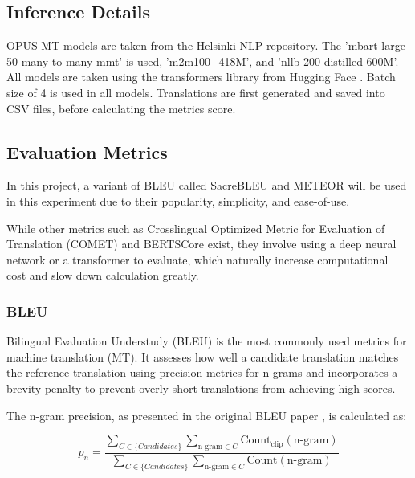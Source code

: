 \documentclass[a4paper]{article}
\begin{document}


\subsection{Inference Details}

OPUS-MT models are taken from the Helsinki-NLP repository. The 'mbart-large-50-many-to-many-mmt' is used, 'm2m100\_418M', and 'nllb-200-distilled-600M'. All models are taken using the transformers \cite{wolf-etal-2020-transformers} library from Hugging Face \cite{huggingface}. Batch size of 4 is used in all models. Translations are first generated and saved into CSV files, before calculating the metrics score.


\subsection{Evaluation Metrics}


In this project, a variant of BLEU \cite{papieni-2002-bleu} called SacreBLEU \cite{post-2018-sacrebleu} and METEOR \cite{lavie-2007-meteor} will be used in this experiment due to their popularity, simplicity, and ease-of-use.

While other metrics such as Crosslingual Optimized Metric for Evaluation of Translation (COMET) \cite{rei-2020-comet} and BERTSCore \cite{zhang-2020-bertscore} exist, they involve using a deep neural network or a transformer to evaluate, which naturally increase computational cost and slow down calculation greatly.

\subsubsection{BLEU}

Bilingual Evaluation Understudy (BLEU) \cite{papieni-2002-bleu} is the most commonly used metrics for machine translation (MT). It assesses how well a candidate translation matches the reference translation using precision metrics for n-grams and incorporates a brevity penalty to prevent overly short translations from achieving high scores.

The n-gram precision, as presented in the original BLEU paper \cite{papieni-2002-bleu}, is calculated as:

\begin{equation}
    p_n = \frac{\sum_{C \in \{Candidates\}} \sum_{\text{n-gram} \in C} \text{Count}_{\text{clip}}(\text{n-gram})}{\sum_{C \in \{Candidates\}} \sum_{\text{n-gram} \in C} \text{Count}(\text{n-gram})}
\end{equation}
\end{document}
